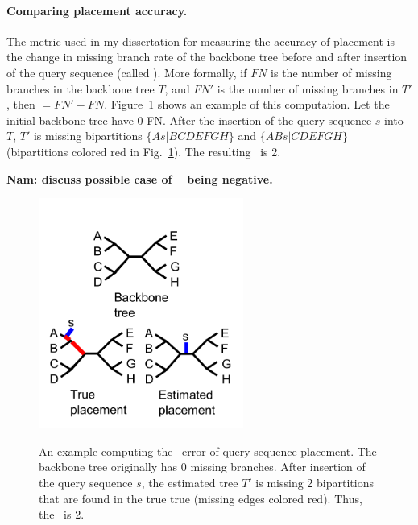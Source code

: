 \paragraph{Comparing placement accuracy.}  
The metric used in my dissertation for measuring the accuracy of placement is the change in missing branch rate of the backbone tree before and after insertion of the query sequence (called \deltafn ).  More formally, if $FN$ is the number of missing branches in the backbone tree $T$, and $FN'$ is the number of missing branches in $T'$, then \deltafn$=FN'-FN$.  Figure~\ref{back:placement_error} shows an example of this computation.  Let the initial backbone tree have 0 FN.  After the insertion of the query sequence $s$ into $T$, $T'$ is missing bipartitions $\{As|BCDEFGH\}$ and $\{ABs|CDEFGH\}$ (bipartitions colored red in Fig.~\ref{back:placement_error}).  The resulting \deltafn~is 2.

\textbf{Nam: discuss possible case of \deltafn~ being negative.}

\begin{figure}[htbp]
\centering
{\includegraphics[width=0.60\textwidth]{background/unrooted_phylogeny_b}}
\caption[Computing \deltafn~error of query sequence placement.]{\label{back:placement_error}An example computing the \deltafn~error of query sequence placement.  The backbone tree originally has 0 missing branches.  After insertion of the query sequence $s$, the estimated tree $T'$ is missing 2 bipartitions that are found in the true true (missing edges colored red).  Thus, the \deltafn~is 2.}
\end{figure}

